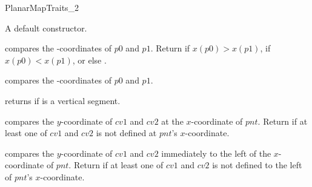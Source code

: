 \begin{ccRefConcept}{PlanarMapTraits_2}
    
    
    

    

\ccCreation
    

    {A default constructor.}

    \ccOperations

     {compares the -coordinates
       of $p0$ and $p1$.  Return  if $x(p0) >
       x(p1)$,  if $x(p0) < x(p1)$, or else
       .  }
    
     {compares the
       -coordinates of $p0$ and $p1$.}


   {returns  if  is a vertical segment.}
        
    
    {compares the $y$-coordinate of $cv1$ and $cv2$ at the $x$-coordinate 
     of $pnt$. Return  if at least one of $cv1$ and $cv2$  
     is not defined at $pnt$'s $x$-coordinate.}
   
  {compares the $y$-coordinate of $cv1$ and $cv2$ immediately to the
     left of the $x$-coordinate of $pnt$. Return 
     if at least one of $cv1$ and $cv2$ is not defined to the left of $pnt$'s
     $x$-coordinate.}
    

\end{ccRefConcept}
